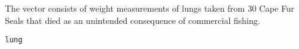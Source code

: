 \begin{Description}\relax
The  vector consists  
of weight measurements of lungs taken from 30 Cape Fur
Seals that died as an unintended consequence of commercial fishing.
\end{Description}
\begin{Usage}
\begin{verbatim}lung\end{verbatim}
\end{Usage}


